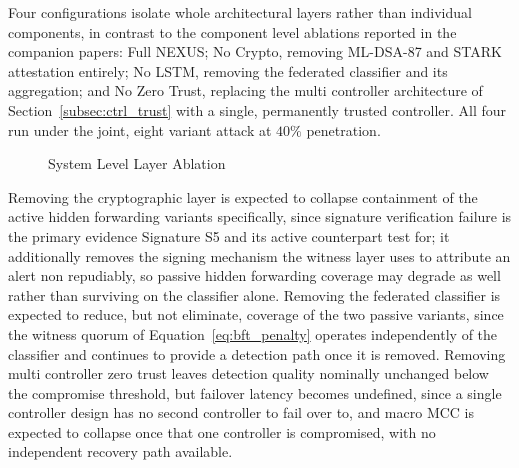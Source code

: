 \documentclass[lettersize,journal]{IEEEtran}
\theoremstyle{plain}
\theoremstyle{remark}
\begin{document}
	Four configurations isolate whole architectural layers rather than
	individual components, in contrast to the component level ablations
	reported in the companion papers: Full NEXUS; No Crypto, removing
	ML-DSA-87 and STARK attestation entirely; No LSTM, removing the
	federated classifier and its aggregation; and No Zero Trust, replacing
	the multi controller architecture of Section~\ref{subsec:ctrl_trust}
	with a single, permanently trusted controller. All four run under the
	joint, eight variant attack at $40\%$ penetration.
	\begin{figure}[!t]
		\centering
		\caption{System Level Layer Ablation}
		\label{fig:n3_radar}
	\end{figure}
	Removing the cryptographic layer is expected to collapse containment of
	the active hidden forwarding variants specifically, since signature
	verification failure is the primary evidence Signature S5 and its
	active counterpart test for; it additionally removes the signing
	mechanism the witness layer uses to attribute an alert non repudiably,
	so passive hidden forwarding coverage may degrade as well rather than
	surviving on the classifier alone. Removing the federated classifier is
	expected to reduce, but not eliminate, coverage of the two passive
	variants, since the witness quorum of Equation~\eqref{eq:bft_penalty}
	operates independently of the classifier and continues to provide a
	detection path once it is removed. Removing multi controller zero trust
	leaves detection quality nominally unchanged below the compromise
	threshold, but failover latency becomes undefined, since a single
	controller design has no second controller to fail over to, and macro
	MCC is expected to collapse once that one controller is compromised,
	with no independent recovery path available.
	
\end{document}
